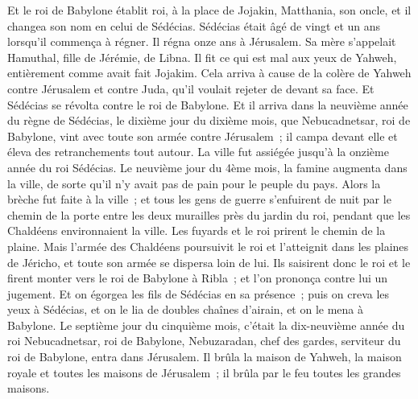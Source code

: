 \begin{multicols}{2}
Et le roi de Babylone établit roi, à la place de Jojakin, Matthania, son oncle, et il changea son nom en celui de Sédécias.
Sédécias était âgé de vingt et un ans lorsqu'il commença à régner. Il régna onze ans à Jérusalem. Sa mère s'appelait Hamuthal, fille de Jérémie, de Libna.
Il fit ce qui est mal aux yeux de Yahweh, entièrement comme avait fait Jojakim.
Cela arriva à cause de la colère de Yahweh contre Jérusalem et contre Juda, qu'il voulait rejeter de devant sa face. Et Sédécias se révolta contre le roi de Babylone.
\VerseOne{}Et il arriva dans la neuvième année du règne de Sédécias, le dixième jour du dixième mois, que Nebucadnetsar, roi de Babylone, vint avec toute son armée contre Jérusalem~; il campa devant elle et éleva des retranchements tout autour.
La ville fut assiégée jusqu'à la onzième année du roi Sédécias.
Le neuvième jour du 4ème mois, la famine augmenta dans la ville, de sorte qu'il n'y avait pas de pain pour le peuple du pays.
Alors la brèche fut faite à la ville~; et tous les gens de guerre s'enfuirent de nuit par le chemin de la porte entre les deux murailles près du jardin du roi, pendant que les Chaldéens environnaient la ville. Les fuyards et le roi prirent le chemin de la plaine.
Mais l'armée des Chaldéens poursuivit le roi et l'atteignit dans les plaines de Jéricho, et toute son armée se dispersa loin de lui.
Ils saisirent donc le roi et le firent monter vers le roi de Babylone à Ribla~; et l'on prononça contre lui un jugement.
Et on égorgea les fils de Sédécias en sa présence~; puis on creva les yeux à Sédécias, et on le lia de doubles chaînes d'airain, et on le mena à Babylone.
Le septième jour du cinquième mois, c'était la dix-neuvième année du roi Nebucadnetsar, roi de Babylone, Nebuzaradan, chef des gardes, serviteur du roi de Babylone, entra dans Jérusalem.
Il brûla la maison de Yahweh, la maison royale et toutes les maisons de Jérusalem~; il brûla par le feu toutes les grandes maisons.

\end{multicols}

